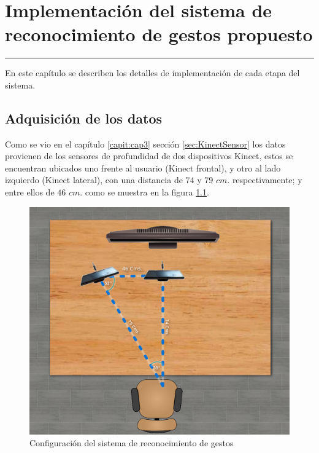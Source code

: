 \chapter{Implementación del sistema de reconocimiento de gestos propuesto}\label{capit:cap4}
\vspace{-2.0325ex}%
\noindent
\rule{\textwidth}{0.5pt}
\vspace{-5.5ex}%
\newcommand{\pushline}{\Indp}%

En este cap\'itulo se describen los detalles de implementación de cada etapa del sistema.   

\section{Adquisición de los datos}\label{sec:AdquisicionDatos}

Como se vio en el capítulo \ref{capit:cap3} sección \ref{sec:KinectSensor} los datos provienen de los sensores de profundidad de dos dispositivos Kinect, estos se encuentran ubicados uno frente al usuario (Kinect frontal), y otro al lado  izquierdo (Kinect lateral), con una distancia de $74$ y $79$ $cm.$ respectivamente; y entre ellos de $46$ $cm.$ como se muestra en la figura \ref{fig:SetupSystem}.
\begin{figure}[!h]
\begin{center}
\includegraphics[scale=.2]{./Figures/system.png}
\end{center}
\caption{Configuración del sistema de reconocimiento de gestos}
\label{fig:SetupSystem}
\end{figure}  

